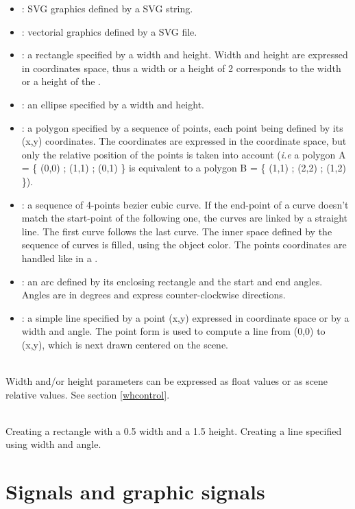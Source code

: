 \documentclass[a4paper,twoside]{report}
\newcommand{\sublevel}[1]	{\section{#1}}
\begin{document}
\begin{itemize}
\item {}: SVG graphics defined by a SVG string.
\item {}: vectorial graphics defined by a SVG file.
\item {}: a rectangle specified by a width and height. Width and height are expressed in  coordinates space, thus a width or a height of 2 corresponds to the width or a height of the .
\item {}: an ellipse specified by a width and height.
\item {}: a polygon specified by a sequence of points, each point being defined by its (x,y) coordinates. The coordinates are expressed in the  coordinate space, but only the relative position of the points is taken into account (\emph{i.e} a polygon A = \{ (0,0) ; (1,1) ; (0,1) \} is equivalent to a polygon B = \{ (1,1) ; (2,2) ; (1,2) \}).
\item {}: a sequence of 4-points bezier cubic curve. If the end-point of a curve doesn't match the start-point of the following one, the curves are linked by a straight line. The first curve follows the last curve. The inner space defined by the sequence of curves is filled, using the object color. The points coordinates are handled like in a .
\item {}: an arc defined by its enclosing rectangle and the start and end angles. Angles are in degrees and express counter-clockwise directions.
\item {}: a simple line specified by a point (x,y) expressed in  coordinate space or by a width and angle. The point form is used to compute a line from (0,0) to (x,y), which is next drawn centered on the scene.
\end{itemize}

\note\\
Width and/or height parameters can be expressed as float values or as scene relative values. See section \ref{whcontrol}.

\example \\
Creating a rectangle with a 0.5 width and a 1.5 height.
Creating a line specified using width and angle.


\sublevel{Signals and graphic signals}
\label{sigscore}
\end{document}
